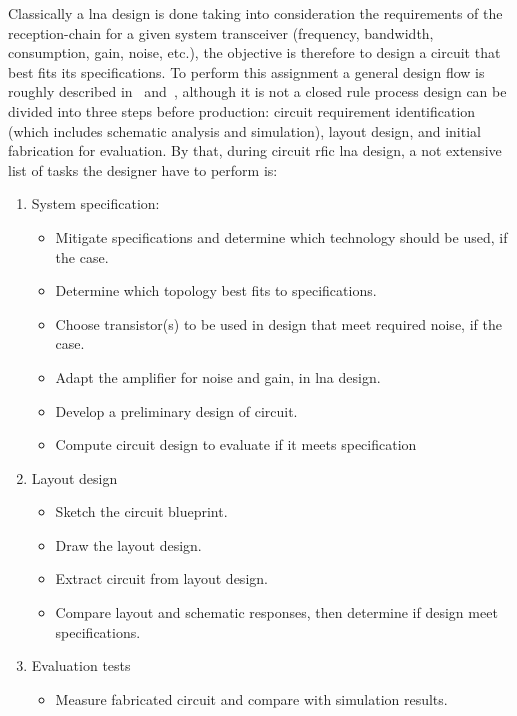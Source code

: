 Classically a \gls{lna} design is done taking into consideration the requirements of the reception-chain for a given system transceiver (frequency, bandwidth, consumption, gain, noise, etc.), the objective is therefore to design a circuit that best fits its specifications. To perform this assignment a general design flow is roughly described in~\cite{geiger1990vlsi} and~\cite{saint2001ICGuide}, although it is not a closed rule process design can be divided into three steps before production: circuit requirement identification (which includes schematic analysis and simulation), layout design, and initial fabrication for evaluation. By that, during circuit \gls{rfic} \gls{lna} design, a not extensive list of tasks the designer have to perform is:
\begin{enumerate}[nolistsep]
\item System specification:
\begin{itemize}[nolistsep]
	\item Mitigate  specifications and determine which technology should be used, if the case.
	\item Determine which topology best fits to specifications.
	\item Choose transistor(s) to be used in design that meet required noise, if the case.
	\item Adapt the amplifier for noise and gain, in \gls{lna} design.
	\item Develop a preliminary design of circuit.
	\item Compute circuit design to evaluate if it meets specification
\end{itemize}
\item Layout design
\begin{itemize}[nolistsep]
	\item Sketch the circuit blueprint.
	\item Draw the layout design.
	\item Extract circuit from layout design.
	\item Compare layout and schematic responses, then determine if design meet specifications.
\end{itemize}
\item Evaluation tests
\begin{itemize}[nolistsep]
	\item Measure fabricated circuit and compare with simulation results.
\end{itemize}
\end{enumerate}

